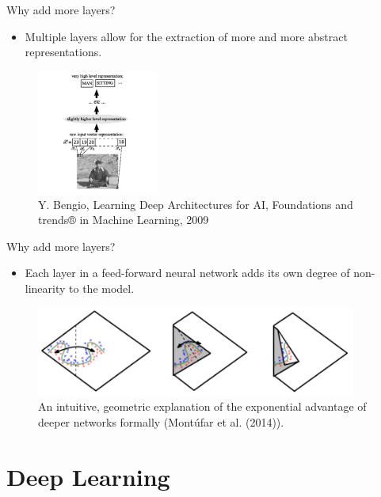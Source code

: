 \begin{vbframe}{Why add more layers?}
\begin{itemize}
  \item Multiple layers allow for the extraction of more and more abstract representations.
\end{itemize}
  \begin{figure}
    \centering
      \includegraphics[width=4cm]{plots/hierachicalRepresentations.png}
      \caption{Y. Bengio,  Learning Deep Architectures for AI, Foundations and trends® in Machine Learning, 2009}
  \end{figure}
\end{vbframe}


\begin{vbframe}{Why add more layers?}
\begin{itemize}
  \item Each layer in a feed-forward neural network adds its own degree of non-linearity to the model.
\end{itemize}
  \begin{figure}
    \centering
      \includegraphics[width=10.5cm]{plots/folding}
      \caption{An intuitive, geometric explanation of the exponential advantage of deeper networks formally (Mont\'{u}far et al. (2014)).}
  \end{figure}
\end{vbframe}

\section{Deep Learning}

